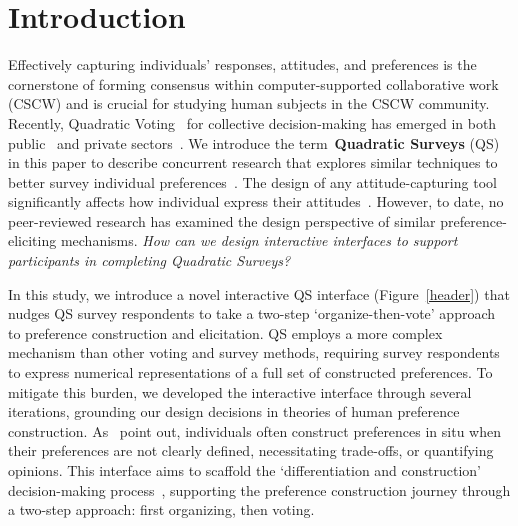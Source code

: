 \section{Introduction}
Effectively capturing individuals' responses, attitudes, and preferences is the cornerstone of forming consensus within computer-supported collaborative work (CSCW) and is crucial for studying human subjects in the CSCW community. Recently, Quadratic Voting~\cite{posner2018radical} for collective decision-making has emerged in both public~\cite{rogersColoradoTriedNew2019, QuadraticVotingColorado, teamTaiwanDigitalMinister} and private sectors~\cite{Gov4gitDecentralizedPlatform2023}. We introduce the term~\textbf{Quadratic Surveys} (QS) in this paper to describe concurrent research that explores similar techniques to better survey individual preferences~\cite{quarfoot2017quadratic, chengCanShowWhat2021}. The design of any attitude-capturing tool significantly affects how individual express their attitudes~\cite{engstrom2020politics, weijtersEffectRatingScale2010, kierujVariationsResponseStyle2010, toepoelSmileysStarsHearts2019, farzandAestheticsEvaluatingResponse2024, xiaoTellMeYourself2020, pielotDidYouMisclick2024}. However, to date, no peer-reviewed research has examined the design perspective of similar preference-eliciting mechanisms. \textit{How can we design interactive interfaces to support participants in completing Quadratic Surveys?}

In this study, we introduce a novel interactive QS interface (Figure~\ref{header}) that nudges QS survey respondents to take a two-step `organize-then-vote' approach to preference construction and elicitation. QS employs a more complex mechanism than other voting and survey methods, requiring survey respondents to express numerical representations of a full set of constructed preferences. To mitigate this burden, we developed the interactive interface through several iterations, grounding our design decisions in theories of human preference construction. As~\textcite{lichtensteinConstructionPreference2006} point out, individuals often construct preferences in situ when their preferences are not clearly defined, necessitating trade-offs, or quantifying opinions. This interface aims to scaffold the `differentiation and construction' decision-making process~\textcite{svensonDifferentiationConsolidationTheory1992}, supporting the preference construction journey through a two-step approach: first organizing, then voting.

